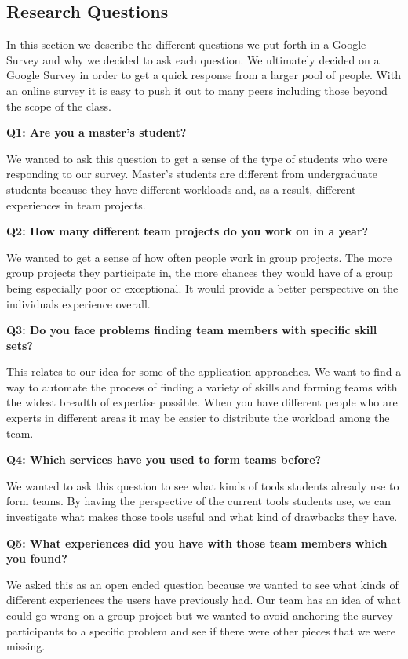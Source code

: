 \documentclass[conference]{IEEEtran}
\begin{document}
\subsection{Research Questions}
In this section we describe the different questions we put forth in a Google Survey 
and why we decided to ask each question. We ultimately decided on a Google Survey in
order to get a quick response from a larger pool of people. With an online survey it
is easy to push it out to many peers including those beyond the scope of the class.

\textbf{Q1: Are you a master's student?}

We wanted to ask this question to get a sense of the type of students who were responding
to our survey. Master's students are different from undergraduate students because they
have different workloads and, as a result, different experiences in team projects.

\textbf{Q2: How many different team projects do you work on in a year?}

We wanted to get a sense of how often people work in group projects. The more group 
projects they participate in, the more chances they would have of a group being
especially poor or exceptional. It would provide a better perspective on the
individuals experience overall.

\textbf{Q3: Do you face problems finding team members with specific skill sets?}

This relates to our idea for some of the application approaches. We want to find a way
to automate the process of finding a variety of skills and forming teams with the widest
breadth of expertise possible. When you have different people who are experts in different areas
it may be easier to distribute the workload among the team.

\textbf{Q4: Which services have you used to form teams before?}

We wanted to ask this question to see what kinds of tools students already use to form teams. 
By having the perspective of the current tools students use, we can investigate what makes those 
tools useful and what kind of drawbacks they have. 

\textbf{Q5: What experiences did you have with those team members which you found?}

We asked this as an open ended question because we wanted to see what kinds of different
experiences the users have previously had. Our team has an idea of what could go wrong on
a group project but we wanted to avoid anchoring the survey participants to a specific 
problem and see if there were other pieces that we were missing. 
\end{document}
